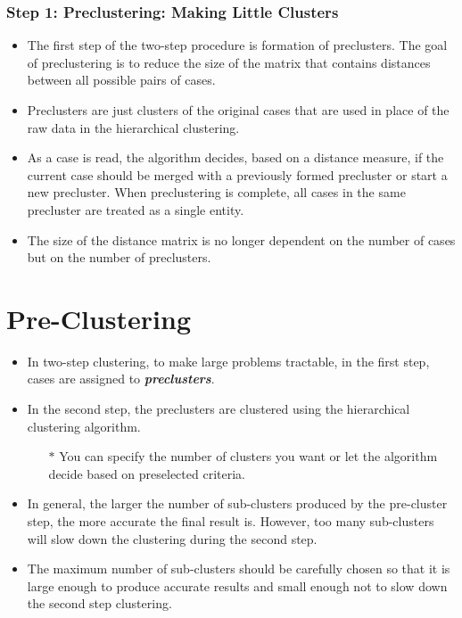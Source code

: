\documentclass[a4paper,12pt]{article}
\begin{document}
\begin{itemize}
\begin{itemize}
	\subsubsection{Step 1: Preclustering: Making Little Clusters}
	\begin{itemize}
		\item The first step of the two-step procedure is formation of preclusters. The goal of
		preclustering is to reduce the size of the matrix that contains distances between all
		possible pairs of cases.    \item Preclusters are just clusters of the original cases that are used
		in place of the raw data in the hierarchical clustering.     \item As a case is read, the algorithm
		decides, based on a distance measure, if the current case should be merged with a
		previously formed precluster or start a new precluster. When preclustering is complete,
		all cases in the same precluster are treated as a single entity.     \item The size of the distance
		matrix is no longer dependent on the number of cases but on the number of preclusters.
	\end{itemize}
	

\end{itemize}
\end{itemize}





\section{Pre-Clustering}
\begin{itemize}
	\item In two-step clustering, to make large problems tractable, in the first step, cases are
	assigned to \textbf{\textit{preclusters}}. 
	\item In the second step, the preclusters are clustered using the
	hierarchical clustering algorithm. \begin{itemize}
		\item[$\ast$] You can specify the number of clusters you want or
	let the algorithm decide based on preselected criteria.
	\end{itemize}
	\item In general, the larger the number of sub-clusters produced by the pre-cluster step, the more accurate the final result is. However, too many sub-clusters will slow down the clustering during the second step.
	
	\item The maximum number of sub-clusters should be carefully chosen so that it is large enough to produce accurate results and small enough not to slow down the second step clustering.
	
\end{itemize}
\end{document}
